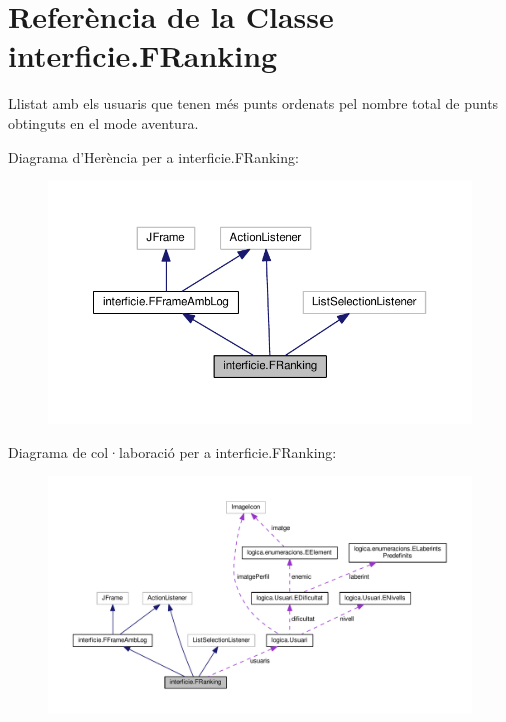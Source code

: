 \hypertarget{classinterficie_1_1_f_ranking}{\section{Referència de la Classe interficie.\+F\+Ranking}
\label{classinterficie_1_1_f_ranking}
}


Llistat amb els usuaris que tenen més punts ordenats pel nombre total de punts obtinguts en el mode aventura.  




Diagrama d'Herència per a interficie.\+F\+Ranking\+:
\nopagebreak
\begin{figure}[H]
\begin{center}
\leavevmode
\includegraphics[width=350pt]{classinterficie_1_1_f_ranking__inherit__graph}
\end{center}
\end{figure}


Diagrama de col·laboració per a interficie.\+F\+Ranking\+:
\nopagebreak
\begin{figure}[H]
\begin{center}
\leavevmode
\includegraphics[width=350pt]{classinterficie_1_1_f_ranking__coll__graph}
\end{center}
\end{figure}
